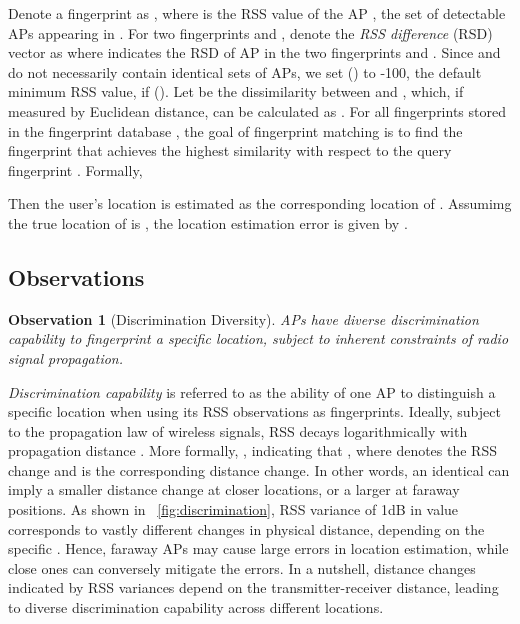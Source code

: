 \documentclass[10pt,conference,compsocconf,letterpaper]{./sty/IEEEtran}
\newcommand{\term}[1]{{\it #1}}
\newtheorem{obsv}{Observation}
\newcommand{\rev}[1]{{\color{blue}#1}} \newcommand{\com}[1]{\textbf{\color{red}(COMMENT: #1)}} \else
\newcommand{\rev}[1]{#1}
\newcommand{\com}[1]{}
\begin{document}
Denote a fingerprint as , where  is the RSS value of the AP , the set of  detectable APs appearing in . 
For two fingerprints  and , denote the \term{RSS difference} (RSD) vector as  where  indicates the RSD of AP  in the two fingerprints and . Since  and  do not necessarily contain identical sets of APs, we set  () to -100, the default minimum RSS value, if  (). Let  be the dissimilarity between   and , which, if measured by Euclidean distance, can be calculated as . For all fingerprints stored in the fingerprint database , the goal of fingerprint matching is to find the fingerprint  that achieves the highest similarity with respect to the query fingerprint . Formally,

Then the user's location is estimated as the corresponding location  of . Assumimg the true location of  is , the location estimation error is given by .



\subsection{Observations}

\begin{obsv}[Discrimination Diversity]
APs have diverse discrimination capability to fingerprint a specific location, subject to inherent constraints of radio signal propagation. \end{obsv}
\term{Discrimination capability} is referred to as the ability of one AP to distinguish a specific location when using its RSS observations as fingerprints. Ideally, subject to the propagation law of wireless signals, RSS decays logarithmically with propagation distance . More formally, , indicating that , where  denotes the RSS change and  is the corresponding distance change. \rev{In other words, an identical  can imply a smaller distance change  at closer locations, or a larger  at faraway positions.} As shown in \figurename~\ref{fig:discrimination}, RSS variance of 1dB in value corresponds to vastly different changes in physical distance, depending on the specific . Hence, faraway APs may cause large errors in location estimation, while close ones can conversely mitigate the errors. 
In a nutshell, distance changes indicated by RSS variances depend on the transmitter-receiver distance, leading to diverse discrimination capability across different locations.
\end{document}
